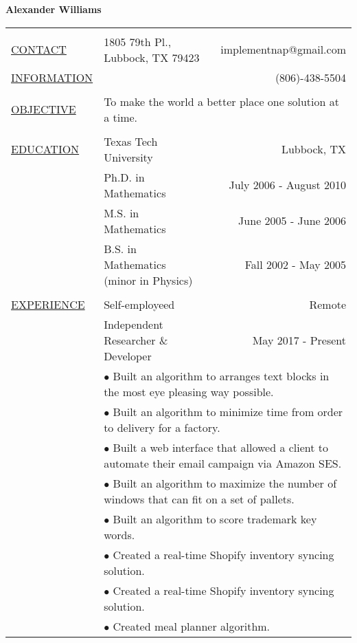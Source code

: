 \documentclass[11pt,oneside,letterpaper,titlepage,fleqn]{article}
\begin{document}
\noindent\LARGE{\textbf{Alexander Williams}}\normalsize{}\\
\hspace{-1em}\begin{tabular}[h]{@{}p{3.25cm}@{}lr}
\hline\\
\underline{CONTACT} & 1805 79th Pl., Lubbock, TX 79423 & implementnap@gmail.com \\
\underline{INFORMATION} &  & (806)-438-5504\\
\\
\underline{OBJECTIVE} &  \multicolumn{2}{p{14cm}}{To make the world a better place one solution at a time.}\\
\\
\underline{EDUCATION} & Texas Tech University & Lubbock, TX\\
           & Ph.D. in Mathematics & July 2006 - August 2010\\            
           & M.S. in Mathematics  & June 2005 - June 2006\\                       
           & B.S. in Mathematics (minor in Physics) & Fall 2002 - May 2005\\
\\
\underline{EXPERIENCE} & Self-employeed & Remote\\
           & Independent Researcher \& Developer & May 2017 - Present\\
           & \multicolumn{2}{p{14cm}}{$\bullet$ Built an algorithm to arranges text blocks in the most eye pleasing way possible.}\\
           & \multicolumn{2}{p{14cm}}{$\bullet$ Built an algorithm to minimize time from order to delivery for a factory. }\\
           & \multicolumn{2}{p{14cm}}{$\bullet$ Built a web interface that allowed a client to automate their email campaign via Amazon SES. }\\
           & \multicolumn{2}{p{14cm}}{$\bullet$ Built an algorithm to maximize the number of windows that can fit on a set of pallets. }\\
           & \multicolumn{2}{p{14cm}}{$\bullet$ Built an algorithm to score trademark key words. }\\
           & \multicolumn{2}{p{14cm}}{$\bullet$ Created a real-time Shopify inventory syncing solution. }\\
           & \multicolumn{2}{p{14cm}}{$\bullet$ Created a real-time Shopify inventory syncing solution. }\\
           & \multicolumn{2}{p{14cm}}{$\bullet$ Created meal planner algorithm. }\\

\end{tabular}
\end{document}
